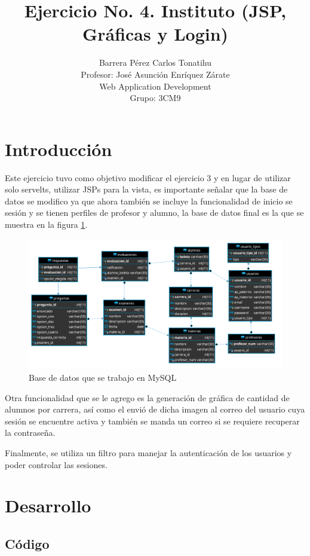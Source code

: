 \documentclass[a4paper,12pt]{article}
\title{Ejercicio No. 4. Instituto (JSP, Gráficas y Login)}
\author{Barrera Pérez Carlos Tonatihu \\ Profesor: José Asunción Enríquez 
Zárate \\ Web Application Development \\ Grupo: 3CM9 }
\begin{document}
\maketitle

\newpage
\tableofcontents
\newpage
\section{Introducción}
Este ejercicio tuvo como objetivo modificar el ejercicio 3 y en lugar de 
utilizar solo servelts, utilizar JSPs para la vista, es importante señalar que 
la base de datos se modifico ya que ahora también se incluye la funcionalidad 
de inicio se sesión y se tienen perfiles de profesor y alumno, la base de datos 
final es la que se muestra en la figura \ref{fig:bd}.

\begin{figure}[H]
\begin{center}
 \includegraphics[width=\textwidth]{base.png}
 \caption{Base de datos que se trabajo en MySQL}
 \label{fig:bd}
\end{center}
\end{figure}

Otra funcionalidad que se le agrego es la generación de gráfica de cantidad de 
alumnos por carrera, así como el envió de dicha imagen al correo del usuario 
cuya sesión se encuentre activa y también se manda un correo si se requiere 
recuperar la contraseña.

Finalmente, se utiliza un filtro para manejar la autenticación de los usuarios 
y poder controlar las sesiones.

\section{Desarrollo}

\subsection{Código}
\end{document}
